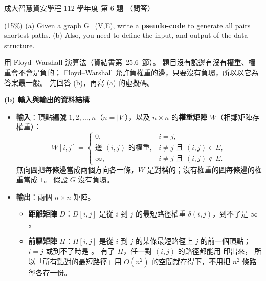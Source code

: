 \begin{pastexam}[label={px:ncku-112-isec-ds-06}]{成大智慧資安學程 112 學年度 第 6 題}
（問答）

(15\%) (a) Given a graph G=(V,E), write a \textbf{pseudo-code} to generate all pairs shortest
paths. (b) Also, you need to define the input, and output of the data structure.
\end{pastexam}

\begin{pastsoln}
用 Floyd--Warshall 演算法（資結書第~25.6~節）。 題目沒有說邊有沒有權重、權重會不會是負的；
Floyd--Warshall 允許負權重的邊，只要沒有負環，所以以它為答案最一般。 先回答 (b)，再寫 (a)
的虛擬碼。

\textbf{(b) 輸入與輸出的資料結構}
\begin{itemize}
\item \textbf{輸入}：頂點編號 $1, 2, \ldots, n$（$n = |V|$），以及 $n \times n$ 的\textbf{權重矩陣}
$W$（相鄰矩陣存權重）：
\[
W[i, j] = \begin{cases}
0, & i = j, \\
\text{邊 } (i, j) \text{ 的權重}, & i \ne j \text{ 且 } (i, j) \in E, \\
\infty, & i \ne j \text{ 且 } (i, j) \notin E.
\end{cases}
\]
無向圖把每條邊當成兩個方向各一條，$W$ 是對稱的；沒有權重的圖每條邊的權重當成 $1$。
假設 $G$ 沒有負環。
\item \textbf{輸出}：兩個 $n \times n$ 矩陣。
\begin{itemize}
\item \textbf{距離矩陣} $D$：$D[i, j]$ 是從 $i$ 到 $j$ 的最短路徑權重 $\delta(i, j)$，到不了是 $\infty$。
\item \textbf{前驅矩陣} $\Pi$：$\Pi[i, j]$ 是從 $i$ 到 $j$ 的某條最短路徑上 $j$ 的前一個頂點；
$i = j$ 或到不了時是 \NIL。 有了 $\Pi$，任一對 $(i, j)$ 的路徑都能用  印出來，
所以「所有點對的最短路徑」用 $O(n^2)$ 的空間就存得下，不用把 $n^2$ 條路徑各存一份。
\end{itemize}
\end{itemize}


\end{pastsoln}
